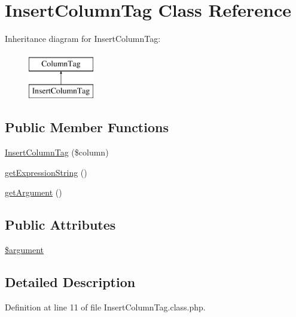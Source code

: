 \hypertarget{classInsertColumnTag}{\section{Insert\-Column\-Tag Class Reference}
\label{classInsertColumnTag}
}
Inheritance diagram for Insert\-Column\-Tag\-:\begin{figure}[H]
\begin{center}
\leavevmode
\includegraphics[height=2.000000cm]{classInsertColumnTag}
\end{center}
\end{figure}
\subsection*{Public Member Functions}
\begin{DoxyCompactItemize}
\item 
\hyperlink{classInsertColumnTag_a7ca1654435b7a6e73d269f9e4f50e119}{Insert\-Column\-Tag} (\$column)
\item 
\hyperlink{classInsertColumnTag_a77e3aba891447e4d9fddc8a91c6ca9da}{get\-Expression\-String} ()
\item 
\hyperlink{classInsertColumnTag_a951d60b78c53d03e3921c1082502ccc4}{get\-Argument} ()
\end{DoxyCompactItemize}
\subsection*{Public Attributes}
\begin{DoxyCompactItemize}
\item 
\hyperlink{classInsertColumnTag_a1aa52b3296f70706efacf27d1a1abc6c}{\$argument}
\end{DoxyCompactItemize}


\subsection{Detailed Description}


Definition at line 11 of file Insert\-Column\-Tag.\-class.\-php.



